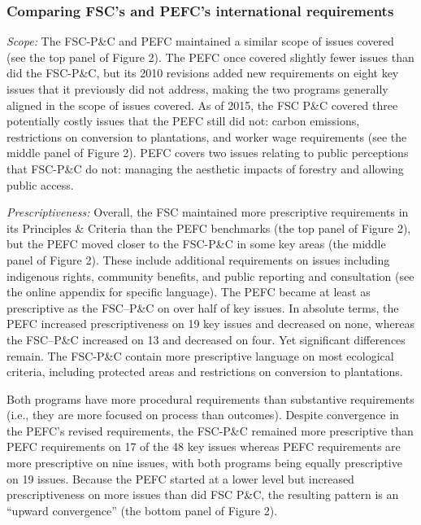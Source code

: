 \documentclass[
      12pt,
            Review ]{article}
\begin{document}
\subsubsection{Comparing FSC's and PEFC's international
requirements}\label{comparing-fscs-and-pefcs-international-requirements}

\emph{Scope:} The FSC-P\&C and PEFC maintained a similar scope of issues
covered (see the top panel of Figure 2). The PEFC once covered slightly
fewer issues than did the FSC-P\&C, but its 2010 revisions added new
requirements on eight key issues that it previously did not address,
making the two programs generally aligned in the scope of issues
covered. As of 2015, the FSC P\&C covered three potentially costly
issues that the PEFC still did not: carbon emissions, restrictions on
conversion to plantations, and worker wage requirements (see the middle
panel of Figure 2). PEFC covers two issues relating to public
perceptions that FSC-P\&C do not: managing the aesthetic impacts of
forestry and allowing public access.

\emph{Prescriptiveness:} Overall, the FSC maintained more prescriptive
requirements in its Principles \& Criteria than the PEFC benchmarks (the
top panel of Figure 2), but the PEFC moved closer to the FSC-P\&C in
some key areas (the middle panel of Figure 2). These include additional
requirements on issues including indigenous rights, community benefits,
and public reporting and consultation (see the online appendix for
specific language). The PEFC became at least as prescriptive as the
FSC--P\&C on over half of key issues. In absolute terms, the PEFC
increased prescriptiveness on 19 key issues and decreased on none,
whereas the FSC--P\&C increased on 13 and decreased on four. Yet
significant differences remain. The FSC-P\&C contain more prescriptive
language on most ecological criteria, including protected areas and
restrictions on conversion to plantations.

Both programs have more procedural requirements than substantive
requirements (i.e., they are more focused on process than outcomes).
Despite convergence in the PEFC's revised requirements, the FSC-P\&C
remained more prescriptive than PEFC requirements on 17 of the 48 key
issues whereas PEFC requirements are more prescriptive on nine issues,
with both programs being equally prescriptive on 19 issues. Because the
PEFC started at a lower level but increased prescriptiveness on more
issues than did FSC P\&C, the resulting pattern is an ``upward
convergence'' (the bottom panel of Figure 2).
\end{document}
